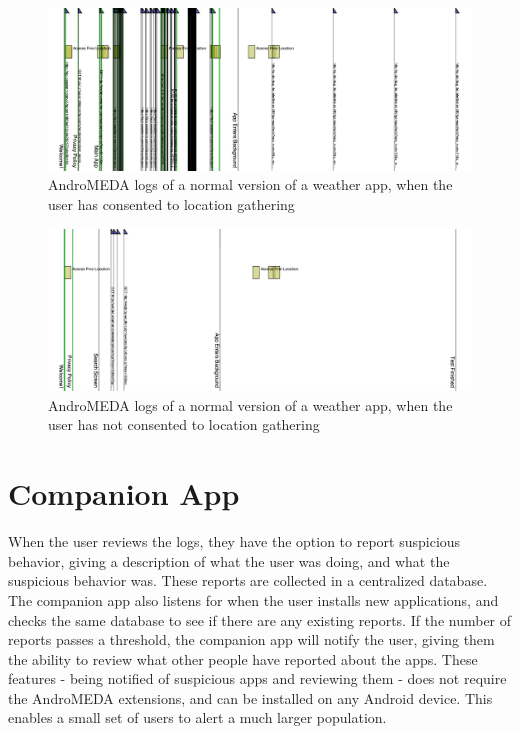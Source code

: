 \begin{figure}[h]
\begin{center}
\includegraphics[width=1.0\columnwidth]{figs/AndroMEDA_Weather_Notmalware_Location}
\caption{AndroMEDA logs of a normal version of a weather app, when the user has consented to location gathering }
\label{fig:spyware_logs_nonmalware_location}
\end{center}
\end{figure}


\begin{figure}[h]
\begin{center}
\includegraphics[width=1.0\columnwidth]{figs/AndroMEDA_Weather_Notmalware_Nolocation}
\caption{AndroMEDA logs of a normal version of a weather app, when the user has not consented to location gathering }
\label{fig:spyware_logs_nonmalware_noloc}
\end{center}
\end{figure}


\section{Companion App}
When the user reviews the logs, they have the option to report suspicious behavior, giving a description of what the user was doing, and what the suspicious behavior was. These reports are collected in a centralized database. The companion app also listens for when the user installs new applications, and checks the same database to see if there are any existing reports. If the number of reports passes a threshold, the companion app will notify the user, giving them the ability to review what other people have reported about the apps. These features - being notified of suspicious apps and reviewing them - does not require the AndroMEDA extensions, and can be installed on any Android device. This enables a small set of users to alert a much larger population.


